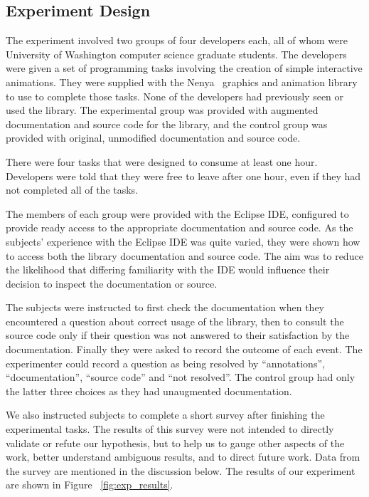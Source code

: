 \subsection{Experiment Design}
The experiment involved two groups of four developers each, all of whom were
University of Washington computer science graduate students. The developers
were given a set of programming tasks involving the creation of simple
interactive animations. They were supplied with the Nenya~\cite{nenya} graphics
and animation library to use to complete those tasks. None of the developers had
previously seen or used the library. The experimental group was provided with
augmented documentation and source code for the library, and the control group
was provided with original, unmodified documentation and source code.

There were four tasks that were designed to consume at least one
hour. Developers were told that they were free to leave after one hour, even if
they had not completed all of the tasks.

The members of each group were provided with the Eclipse IDE, configured to
provide ready access to the appropriate documentation and source code. As the
subjects' experience with the Eclipse IDE was quite varied, they were shown how
to access both the library documentation and source code. The aim was to reduce
the likelihood that differing familiarity with the IDE would influence their
decision to inspect the documentation or source.

The subjects were instructed to first check the documentation when they
encountered a question about correct usage of the library, then to consult the
source code only if their question was not answered to their satisfaction by
the documentation. Finally they were asked to record the outcome of each event.
The experimenter could record a question as being resolved by ``annotations'',
``documentation'', ``source code'' and ``not resolved''. The control group had
only the latter three choices as they had unaugmented documentation.

We also instructed subjects to complete a short survey after finishing the
experimental tasks. The results of this survey were not intended to directly
validate or refute our hypothesis, but to help us to gauge other aspects of the
work, better understand ambiguous results, and to direct future work. Data from
the survey are mentioned in the discussion below. The results of our experiment
are shown in Figure ~\ref{fig:exp_results}.

